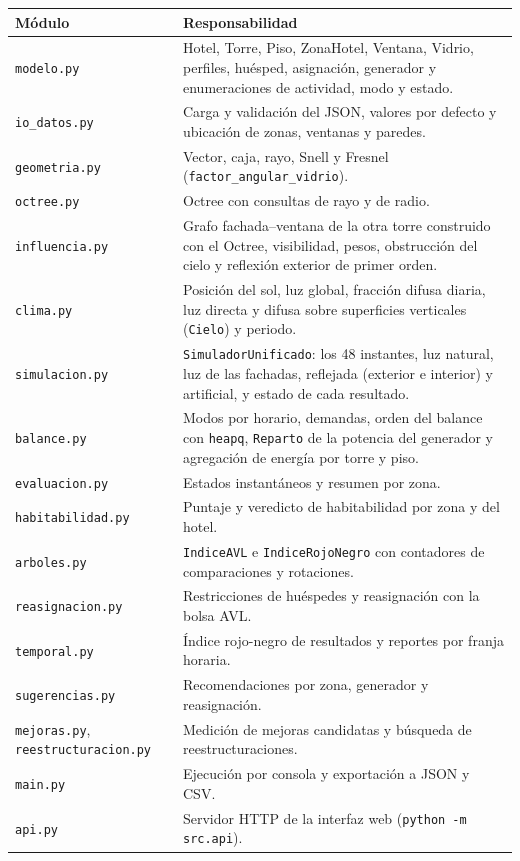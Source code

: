 \documentclass[12pt,a4paper]{article}
\newcommand{\clase}[1]{\texttt{#1}}
\newcommand{\codigo}[1]{\texttt{#1}}
\begin{document}
\begin{center}\small
\begin{tabular}{p{}p{}}
\toprule
\textbf{Módulo} & \textbf{Responsabilidad}\\
\midrule
\codigo{modelo.py} & Hotel, Torre, Piso, ZonaHotel, Ventana, Vidrio, perfiles, huésped, asignación, generador y enumeraciones de actividad, modo y estado.\\
\codigo{io\_datos.py} & Carga y validación del JSON, valores por defecto y ubicación de zonas, ventanas y paredes.\\
\codigo{geometria.py} & Vector, caja, rayo, Snell y Fresnel (\codigo{factor\_angular\_vidrio}).\\
\codigo{octree.py} & Octree con consultas de rayo y de radio.\\
\codigo{influencia.py} & Grafo fachada--ventana de la otra torre construido con el Octree, visibilidad, pesos, obstrucción del cielo y reflexión exterior de primer orden.\\
\codigo{clima.py} & Posición del sol, luz global, fracción difusa diaria, luz directa y difusa sobre superficies verticales (\clase{Cielo}) y periodo.\\
\codigo{simulacion.py} & \clase{SimuladorUnificado}: los 48 instantes, luz natural, luz de las fachadas, reflejada (exterior e interior) y artificial, y estado de cada resultado.\\
\codigo{balance.py} & Modos por horario, demandas, orden del balance con \codigo{heapq}, \clase{Reparto} de la potencia del generador y agregación de energía por torre y piso.\\
\codigo{evaluacion.py} & Estados instantáneos y resumen por zona.\\
\codigo{habitabilidad.py} & Puntaje y veredicto de habitabilidad por zona y del hotel.\\
\codigo{arboles.py} & \clase{IndiceAVL} e \clase{IndiceRojoNegro} con contadores de comparaciones y rotaciones.\\
\codigo{reasignacion.py} & Restricciones de huéspedes y reasignación con la bolsa AVL.\\
\codigo{temporal.py} & Índice rojo-negro de resultados y reportes por franja horaria.\\
\codigo{sugerencias.py} & Recomendaciones por zona, generador y reasignación.\\
\codigo{mejoras.py}, \codigo{reestructuracion.py} & Medición de mejoras candidatas y búsqueda de reestructuraciones.\\
\codigo{main.py} & Ejecución por consola y exportación a JSON y CSV.\\
\codigo{api.py} & Servidor HTTP de la interfaz web (\codigo{python -m src.api}).\\
\bottomrule
\end{tabular}
\end{center}
\end{document}
